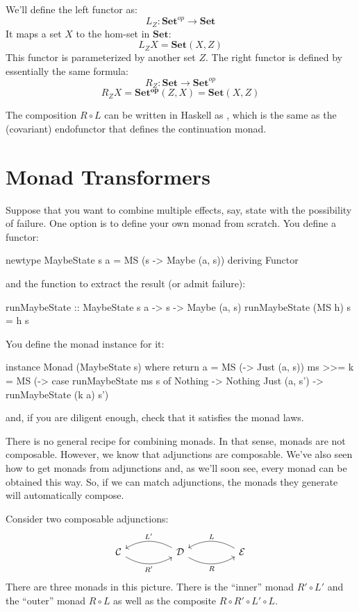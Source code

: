 \documentclass[DaoFP]{subfiles}
\begin{document}
We'll define the left functor as:
\[ L_Z \colon \mathbf{Set}^{op} \to \mathbf{Set} \] 
It maps a set $X$ to the hom-set in $\mathbf{Set}$:
\[ L_Z X = \mathbf{Set}(X, Z) \] 
This functor is parameterized by another set $Z$. The right functor is defined by essentially the same formula:
\[ R_Z \colon \mathbf{Set} \to \mathbf{Set}^{op} \] 
\[ R_Z X = \mathbf{Set^{op}}(Z, X)  = \mathbf{Set}(X, Z) \] 


The composition $R \circ L$ can be written in Haskell as , which is the same as the (covariant) endofunctor that defines the continuation monad.

\section{Monad Transformers}

Suppose that you want to combine multiple effects, say, state with the possibility of failure. One option is to define your own monad from scratch. You define a functor:
\begin{haskell}
newtype MaybeState s a = MS (s -> Maybe (a, s))
  deriving Functor
\end{haskell}
and the function to extract the result (or admit failure):
\begin{haskell}
runMaybeState :: MaybeState s a -> s -> Maybe (a, s)
runMaybeState (MS h) s = h s
\end{haskell}
You define the monad instance for it:
\begin{haskell}
instance Monad (MaybeState s) where
  return a = MS (\s -> Just (a, s))
  ms >>= k = MS (\s -> case runMaybeState ms s of
                       Nothing -> Nothing
                       Just (a, s') -> runMaybeState (k a) s')
\end{haskell}
and, if you are diligent enough, check that it satisfies the monad laws.

There is no general recipe for combining monads. In that sense, monads are not composable. However, we know that adjunctions are composable. We've also seen how to get monads from adjunctions and, as we'll soon see, every monad can be obtained this way. So, if we can match adjunctions, the monads they generate will automatically compose.

Consider two composable adjunctions:
\[
 \begin{tikzcd}
  \mathcal{C}
  \arrow[rr, bend right, "R'"']
  &&
  \mathcal{D}
  \arrow[ll, bend right, "L'"']
    \arrow[rr, bend right, "R"']
&&
  \mathcal{E}
  \arrow[ll, bend right, "L"']
 \end{tikzcd}
\]
There are three monads in this picture. There is the ``inner'' monad $R' \circ L'$ and the ``outer'' monad $R \circ L$ as well as the composite $R \circ R' \circ L' \circ L$. 
\end{document}
